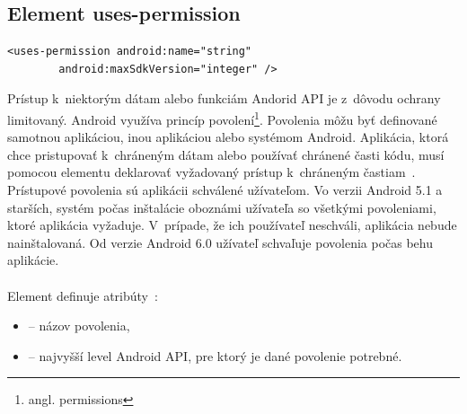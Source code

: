 \subsection{Element uses-permission}
\label{el_uses-permission}
\lstset{language=XML}
\begin{lstlisting}
<uses-permission android:name="string"
        android:maxSdkVersion="integer" />
\end{lstlisting}
Prístup k~niektorým dátam alebo funkciám Andorid API je z~dôvodu ochrany limitovaný. Android využíva princíp povolení\footnote{angl. permissions}. Povolenia môžu byť definované samotnou aplikáciou, inou aplikáciou alebo systémom Android. Aplikácia, ktorá chce pristupovať k~chráneným dátam alebo používať chránené časti kódu, musí pomocou elementu  deklarovať vyžadovaný prístup k~chráneným častiam~\cite{appManifest}. Prístupové povolenia sú aplikácii schválené užívateľom. Vo verzii Android 5.1 a starších, systém počas inštalácie oboznámi užívateľa so všetkými povoleniami, ktoré aplikácia vyžaduje. V~prípade, že ich používateľ neschváli, aplikácia nebude nainštalovaná. Od verzie Android 6.0 užívateľ schvaľuje povolenia počas behu aplikácie.\\\\ 
Element  definuje atribúty~\cite{elUsesPerm}:\\
\begin{itemize}
\item {} -- názov povolenia,
\item {} -- najvyšší level Android API, pre ktorý je dané povolenie potrebné.
\end{itemize}

